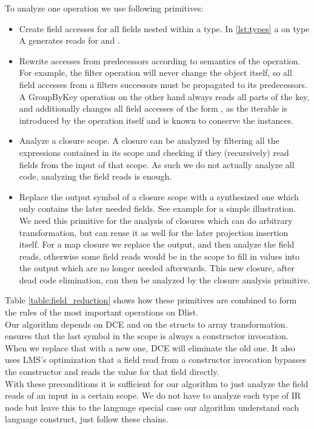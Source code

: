 To analyze one operation we use following primitives:
\begin{itemize}
\item Create field accesses for all fields nested within a type. In \ref{lst:types} a  on type A generates reads for  and . 
\item Rewrite accesses from predecessors according to semantics of the operation. For example, the filter operation will never change the object itself, so all field accesses from a filters successors must be propagated to its predecessors. A GroupByKey operation on the other hand always reads all parts of the key, and additionally changes all field accesses of the form , as the iterable is introduced by the operation itself and is known to conserve the instances.
\item Analyze a closure scope. A closure can be analyzed by filtering all the expressions contained in its scope and checking if they (recursively) read fields from the input of that scope. As such we do not actually analyze all code, analyzing the field reads is enough. 
\item Replace the output symbol of a closure scope with a synthesized one which only contains the later needed fields. See example  for a simple illustration. We need this primitive for the analysis of closures which can do arbitrary transformation, but can reuse it as well for the later projection insertion itself. For a map closure we replace the output, and then analyze the field reads, otherwise some field reads would be in the scope to fill in values into the output which are no longer needed afterwards. This new closure, after dead code elimination, can then be analyzed by the closure analysis primitive.
\end{itemize}
Table \ref{table:field_reduction} shows how these primitives are combined to form the rules of the most important operations on Dlist.\\

Our algorithm depends on DCE and on the  structs to array transformation.  ensures that the last symbol in the scope is always a constructor invocation. When we replace that with a new one, DCE will eliminate the old one. It also uses LMS's optimization that a field read from a constructor invocation bypasses the constructor and reads the value for that field directly.\\
With these preconditions it is sufficient for our algorithm to just analyze the field reads of an input in a certain scope. We do not have to analyze each type of IR node but leave this to the language  special case our algorithm understand each language construct, just follow these chains.

